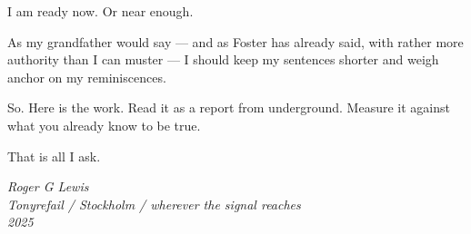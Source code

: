 I am ready now. Or near enough.

As my grandfather would say --- and as Foster has already said, with
rather more authority than I can muster --- I should keep my sentences
shorter and weigh anchor on my reminiscences.

So. Here is the work. Read it as a report from underground. Measure it
against what you already know to be true.

That is all I ask.

\medskip
\textit{Roger G Lewis}\\
\textit{Tonyrefail / Stockholm / wherever the signal reaches}\\
\textit{2025}

\clearpage
